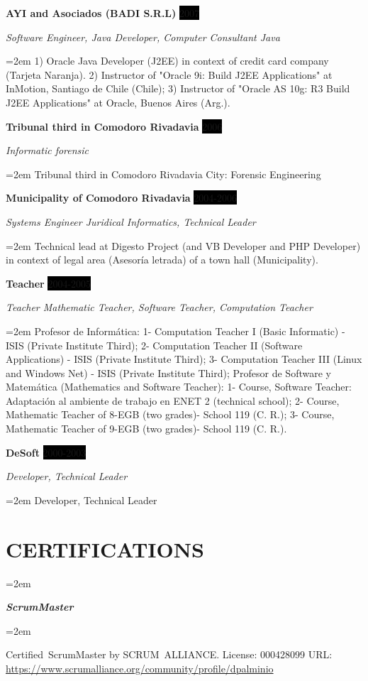 \documentclass[paper=a4,fontsize=11pt]{scrartcl} %
\newlength{\spacebox}
\newcommand{\sepspace}{\vspace*{1em}}		%
\newcommand{\NewPart}[1]{\section*{\uppercase{#1}}}
\newcommand{\CertificatesEntry}[2]{      %
		\noindent\hangindent=2em\hangafter=0 %
		\parbox{\spacebox}{        %
		\textit{#1}}			   %
		\hspace{1.5em} #2 \par}    %
\newcommand{\EducationEntry}[4]{ %
		\noindent \textbf{#1} \hfill      %
		\colorbox{Black}{%
			\parbox{6em}{%
			\hfill\color{White}#2}} \par  %
		\noindent \textit{#3} \par        %
		\noindent\hangindent=2em\hangafter=0 \small #4 %
		\normalsize \par}
\newcommand{\WorkEntry}[4]{				  %
		\noindent \textbf{#1} \hfill      %
		\colorbox{Black}{\color{White}#2} \par  %
		\noindent \textit{#3} \par              %
		\noindent\hangindent=2em\hangafter=0 \small #4 %
		\normalsize \par}
\begin{document}
\WorkEntry{AYI and Asociados (BADI S.R.L)}{2007}{Software Engineer, Java Developer, Computer Consultant Java}
{1) Oracle Java Developer (J2EE) in context of credit card company (Tarjeta Naranja).
2) Instructor of "Oracle 9i: Build J2EE Applications" at InMotion, Santiago de Chile (Chile);
3) Instructor of "Oracle AS 10g: R3 Build J2EE Applications" at Oracle, Buenos Aires (Arg.).}
\sepspace

\WorkEntry{Tribunal third in Comodoro Rivadavia}{2006}{Informatic forensic}{
Tribunal third in Comodoro Rivadavia City: Forensic Engineering}
\sepspace

\WorkEntry{Municipality of Comodoro Rivadavia}{2004-2006}{Systems Engineer Juridical Informatics, Technical Leader}
{Technical lead at Digesto Project (and VB Developer and PHP Developer) in context of legal area (Asesoría letrada) of a town hall (Municipality).}
\sepspace

\WorkEntry{Teacher}{2004-2005}{Teacher Mathematic Teacher, Software Teacher, Computation Teacher}
{Profesor de Informática: 1- Computation Teacher I (Basic Informatic) - ISIS (Private Institute Third); 2- Computation Teacher II (Software Applications) - ISIS (Private Institute Third); 3- Computation Teacher III (Linux and Windows Net) - ISIS (Private Institute Third); Profesor de Software y Matemática (Mathematics and Software Teacher): 1- Course, Software Teacher: Adaptación al ambiente de trabajo en ENET 2 (technical school); 2- Course, Mathematic Teacher of 8-EGB  (two grades)- School 119 (C. R.); 3- Course, Mathematic Teacher of 9-EGB (two grades)- School 119 (C. R.).
}
\sepspace

\WorkEntry{DeSoft}{2000-2003}{Developer, Technical Leader}{
Developer, Technical Leader}
\sepspace

\NewPart{Certifications}{}

\CertificatesEntry{\large{\textbf{ScrumMaster}}}{}
\CertificatesEntry{}{
Certified ScrumMaster by SCRUM ALLIANCE.\newline
License: 000428099\newline
URL: \url{https://www.scrumalliance.org/community/profile/dpalminio}\sepspace
}
\sepspace
\end{document}
